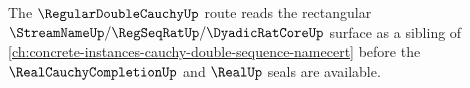 The $\RegularDoubleCauchyUp$ route reads the rectangular $\StreamNameUp/\RegSeqRatUp/\DyadicRatCoreUp$ surface as a sibling of \autoref{ch:concrete-instances-cauchy-double-sequence-namecert} before the $\RealCauchyCompletionUp$ and $\RealUp$ seals are available.




